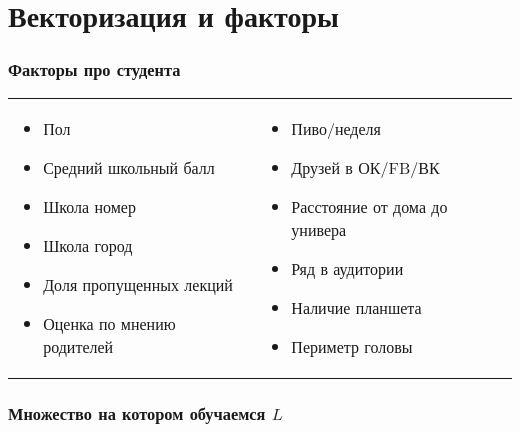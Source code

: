 \documentclass[14pt, fleqn, xcolor={dvipsnames, table}, hyperref={unicode}, babel={english,russian}, inputenc=utf8x]{beamer}
\begin{document}
\section{Векторизация и факторы}
\begin{frame}
\frametitle{Факторы про студента}
\small
\begin{center}
\begin{tabular}{p{}p{}}
\begin{itemize}
  \item Пол
  \item Средний школьный балл
  \item Школа номер
  \item Школа город
  \item Доля пропущенных лекций
  \item Оценка по мнению родителей
\end{itemize} &
\begin{itemize}
  \item Пиво/неделя
  \item Друзей в ОК/FB/ВК
  \item Расстояние от дома до универа
  \item Ряд в аудитории
  \item Наличие планшета
  \item Периметр головы
\end{itemize}
\end{tabular}
\end{center}
\end{frame}


\begin{frame}[t]\frametitle{Множество на котором обучаемся $L$}
\tiny
    \DTLsetseparator{,}
    \renewcommand\dtlstringalign{p{4.5em}}
    \renewcommand\dtlrealalign{p{1.5em}}
    \renewcommand\dtlintalign{p{1.5em}}
    \renewcommand\dtldisplayvalign{c}
    \renewcommand\dtldisplayafterhead{\hline\\}
    \renewcommand*\dtlheaderformat[1]{\textbf{#1}}
    
\end{frame}
\end{document}
